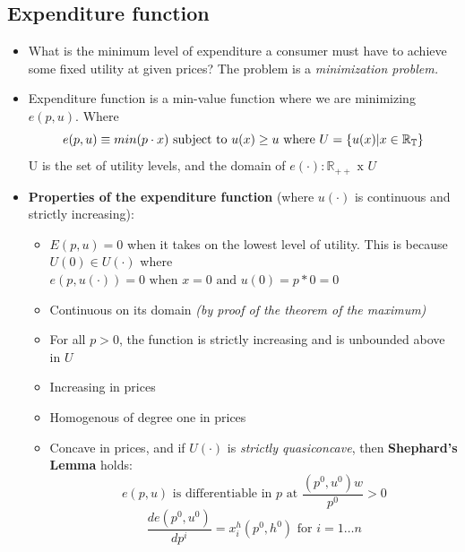 \documentclass{article}
\begin{document}
\subsection{Expenditure function}
\begin{itemize}
    \item What is the minimum level of expenditure a consumer must have to achieve some fixed utility at given prices? The problem is a \textit{minimization problem.}
    \item Expenditure function is a min-value function where we are minimizing $e(p,u)$. Where
    \[
    e(p,u) \equiv min(p\cdot x) \text{ subject to } u(x) \geq u \\ \text{ where } U =\{u(x) | x \in \mathbb{R_{T}}\} \] U is the set of utility levels,
    and the domain of $e(\cdot): \mathbb{R_{++}} \text{ x } U$
    \item \textbf{Properties of the expenditure function} (where $u(\cdot)$ is continuous and strictly increasing): 
    \begin{itemize}
        \item $E(p,u) = 0$ when it takes on the lowest level of utility. This is because $U(0) \in U(\cdot)$ where $e(p,u(\cdot)) = 0 \text{ when } x=0 \text{ and } u(0) = p*0=0$
        \item Continuous on its domain \textit{(by proof of the theorem of the maximum)}
        \item For all $p > 0$, the function is strictly increasing and is unbounded above in $U$
        \item Increasing in prices
        \item Homogenous of degree one in prices 
        \item Concave in prices, and if $U(\cdot)$ is \textit{strictly quasiconcave}, then \textbf{Shephard's Lemma} holds: 
        \[
        e(p,u) \text{ is differentiable in } p \text{ at } \frac{(p^0, u^0)w}{p^0} > 0 
        \]
        \[
        \frac{de(p^0, u^0)}{dp^i} = x_{i}^h(p^0,h^0) \text{ for } i = 1 \dots n
        \]
    \end{itemize}
    
\end{itemize}
\end{document}
